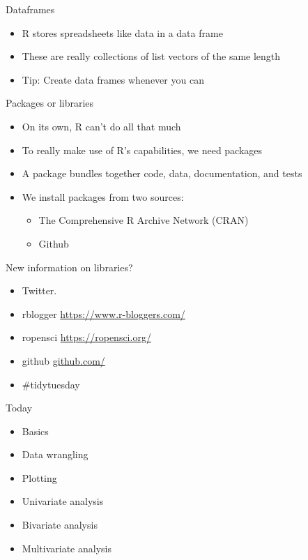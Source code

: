 \documentclass{beamer}
\begin{document}
 \begin{frame}{Dataframes}
\begin{itemize}[<+->]
\item R stores spreadsheets like data in a data frame
\item These are really collections of list vectors of the same length
\item Tip: Create data frames whenever you can
   \end{itemize} 
\end{frame}

 \begin{frame}{Packages or libraries}
\begin{itemize}[<+->]
\item On its own, R can't do all that much
\item To really make use of R's capabilities, we need packages
\item A package bundles together code, data, documentation, and tests
\item We install packages from two sources:
\begin{itemize}
  \item The Comprehensive R Archive Network (CRAN)
  \item Github
\end{itemize}
   \end{itemize} 
\end{frame}

 \begin{frame}{New information on libraries?}
\begin{itemize}[<+->]
\item Twitter.
\item rblogger \url{https://www.r-bloggers.com/}
\item ropensci \url{https://ropensci.org/}
\item github \url{github.com/}
\item \#tidytuesday
   \end{itemize} 
\end{frame}

 \begin{frame}{Today}
\begin{itemize}[<+->]
\item Basics
\item Data wrangling
\item Plotting
\item Univariate analysis
\item Bivariate analysis
\item Multivariate analysis
   \end{itemize} 
\end{frame}
\end{document}
